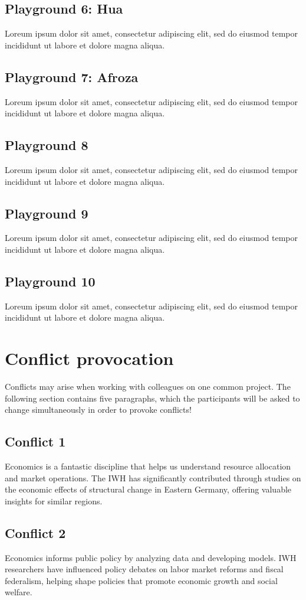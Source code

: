 \documentclass{article}
\begin{document}
\subsection{Playground 6: Hua}
Loreum ipsum dolor sit amet, consectetur adipiscing elit, sed do eiusmod tempor incididunt ut labore et dolore magna aliqua.
\subsection{Playground 7: Afroza}
Loreum ipsum dolor sit amet, consectetur adipiscing elit, sed do eiusmod tempor incididunt ut labore et dolore magna aliqua.
\subsection{Playground 8}
Loreum ipsum dolor sit amet, consectetur adipiscing elit, sed do eiusmod tempor incididunt ut labore et dolore magna aliqua.
\subsection{Playground 9}
Loreum ipsum dolor sit amet, consectetur adipiscing elit, sed do eiusmod tempor incididunt ut labore et dolore magna aliqua.
\subsection{Playground 10}
Loreum ipsum dolor sit amet, consectetur adipiscing elit, sed do eiusmod tempor incididunt ut labore et dolore magna aliqua.




\section{Conflict provocation}
Conflicts may arise when working with colleagues on one common project. The following section contains five paragraphs, which the participants will be asked to change simultaneously in order to provoke conflicts!

\subsection{Conflict 1}
Economics is a fantastic discipline that helps us understand resource allocation and market operations. The IWH has significantly contributed through studies on the economic effects of structural change in Eastern Germany, offering valuable insights for similar regions.

\subsection{Conflict 2}
Economics informs public policy by analyzing data and developing models. IWH researchers have influenced policy debates on labor market reforms and fiscal federalism, helping shape policies that promote economic growth and social welfare.
\end{document}
